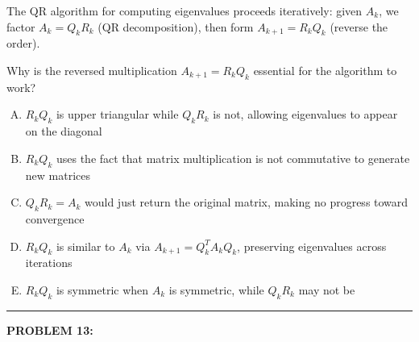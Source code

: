 \documentclass[12pt]{amsart}
\newcommand{\divider}{
  \vspace{-1em} %
  \noindent
  \raisebox{-0.15ex}{\textbullet}%
  \hspace{0.5em}%
  \rule[0.5ex]{0.95\textwidth}{1.0pt}%
  \hspace{0.5em}%
  \raisebox{-0.15ex}{\textbullet}%
  \vspace{0em} %
}
\begin{document}
The QR algorithm for computing eigenvalues proceeds iteratively: given $A_k$, we factor $A_k = Q_k R_k$ (QR decomposition), then form $A_{k+1} = R_k Q_k$ (reverse the order).

Why is the reversed multiplication $A_{k+1} = R_k Q_k$  essential for the algorithm to work?

\begin{enumerate}[(A)]
\item $R_k Q_k$ is upper triangular while $Q_k R_k$ is not, allowing eigenvalues to appear on the diagonal
\item $R_k Q_k$ uses the fact that matrix multiplication is not commutative to generate new matrices
\item $Q_k R_k = A_k$ would just return the original matrix, making no progress toward convergence
\item $R_k Q_k$ is similar to $A_k$ via $A_{k+1} = Q_k^T A_k Q_k$, preserving eigenvalues across iterations
\item $R_k Q_k$ is symmetric when $A_k$ is symmetric, while $Q_k R_k$ may not be
\end{enumerate}


\divider
\newpage



{\bf PROBLEM 13:}
\end{document}
